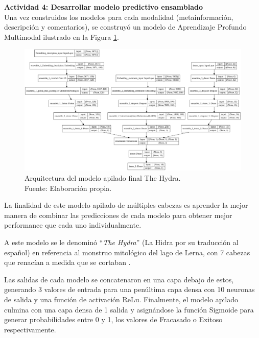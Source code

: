 \begin{landscape}
	\textbf{Actividad 4: Desarrollar modelo predictivo ensamblado}
	\\
	Una vez construidos los modelos para cada modalidad (metainformación, descripción y comentarios), se construyó un modelo de Aprendizaje Profundo Multimodal ilustrado en la Figura \ref{4:fig29}.
	
	\begin{figure}[!ht]
		\begin{center}
			\includegraphics[width=1.20\textwidth]{4/figures/final_stacked_model.png}
			\caption[Arquitectura del modelo apilado final The Hydra]{Arquitectura del modelo apilado final The Hydra.\\
				Fuente: Elaboración propia.}
			\label{4:fig29}
		\end{center}
	\end{figure}
	
\end{landscape}

La finalidad de este modelo apilado de múltiples cabezas es aprender la mejor manera de combinar las predicciones de cada modelo para obtener mejor performance que cada uno individualmente.

A este modelo se le denominó “\textit{The Hydra}” (La Hidra por su traducción al español) en referencia al monstruo mitológico del lago de Lerna, con 7 cabezas que renacían a medida que se cortaban \parencite{ot_rae_hidra}.

Las salidas de cada modelo se concatenaron en una capa debajo de estos, generando 3 valores de entrada para una penúltima capa densa con 10 neuronas de salida y una función de activación ReLu. Finalmente, el modelo apilado culmina con una capa densa de 1 salida y asignándose la función Sigmoide para generar probabilidades entre 0 y 1, los valores de Fracasado o Exitoso respectivamente.

